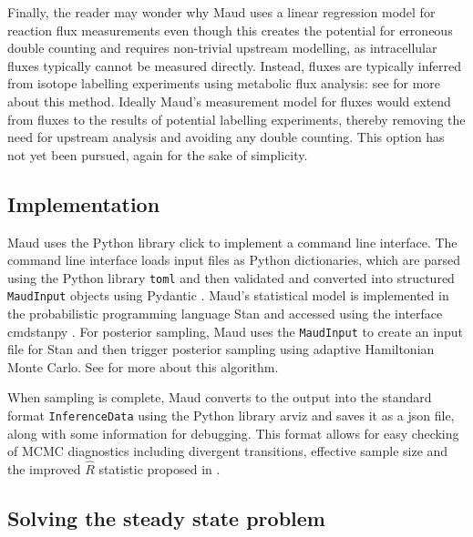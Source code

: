 \documentclass[journal=asbcd6,manuscript=article,layout=traditional]{achemso}
\begin{document}
Finally, the reader may wonder why Maud uses a linear regression model
for reaction flux measurements even though this creates the potential
for erroneous double counting and requires non-trivial upstream
modelling, as intracellular fluxes typically cannot be measured
directly. Instead, fluxes are typically inferred from isotope labelling
experiments using metabolic flux analysis: see
\citet{daiUnderstandingMetabolismFlux2017} for more about this method.
Ideally Maud's measurement model for fluxes would extend from fluxes to
the results of potential labelling experiments, thereby removing the
need for upstream analysis and avoiding any double counting. This option
has not yet been pursued, again for the sake of simplicity.

\subsection{Implementation}\label{implementation}

Maud uses the Python library click
\citep{clickdevelopersClickPythonComposable2022} to implement a command
line interface. The command line interface loads input files as Python
dictionaries, which are parsed using the Python library \texttt{toml}
\citep{pearsonTomlPythonLibrary2020} and then validated and converted
into structured \texttt{MaudInput} objects using Pydantic
\citep{pydanticdevelopersPydantic2022}. Maud's statistical model is
implemented in the probabilistic programming language Stan
\citep{carpenterStanProbabilisticProgramming2017} and accessed using the
interface cmdstanpy \citep{standevelopmentteamCmdStanPy2022}. For
posterior sampling, Maud uses the \texttt{MaudInput} to create an input
file for Stan and then trigger posterior sampling using adaptive
Hamiltonian Monte Carlo. See
\citet{betancourtConceptualIntroductionHamiltonian2018} for more about
this algorithm.

When sampling is complete, Maud converts to the output into the standard
format \texttt{InferenceData} using the Python library arviz
\citep{kumarArviZUnifiedLibrary2019} and saves it as a json file, along
with some information for debugging. This format allows for easy
checking of MCMC diagnostics including divergent transitions, effective
sample size and the improved \(\hat{R}\) statistic proposed in
\citet{vehtariRankNormalizationFoldingLocalization2021}.

\subsection{Solving the steady state
problem}\label{solving-the-steady-state-problem}
\end{document}
